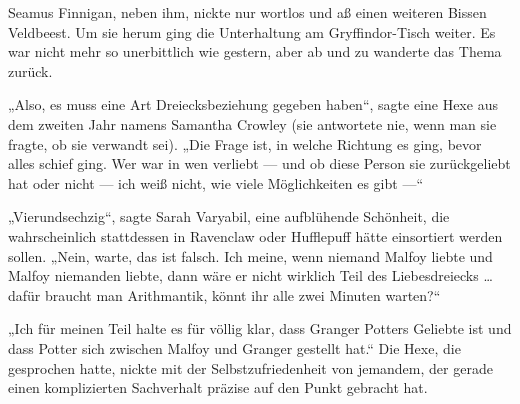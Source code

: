 Seamus Finnigan, neben ihm, nickte nur wortlos und aß einen weiteren Bissen Veldbeest.
Um sie herum ging die Unterhaltung am Gryffindor-Tisch weiter. Es war nicht mehr so unerbittlich wie gestern, aber ab und zu wanderte das Thema zurück.

„Also, es muss eine Art Dreiecksbeziehung gegeben haben“, sagte eine Hexe aus dem zweiten Jahr namens Samantha Crowley (sie antwortete nie, wenn man sie fragte, ob sie verwandt sei).
„Die Frage ist, in welche Richtung es ging, bevor alles schief ging. Wer war in wen verliebt — und ob diese Person sie zurückgeliebt hat oder nicht — ich weiß nicht, wie viele Möglichkeiten es gibt —“

„Vierundsechzig“, sagte Sarah Varyabil, eine aufblühende Schönheit, die wahrscheinlich stattdessen in Ravenclaw oder Hufflepuff hätte einsortiert werden sollen.
„Nein, warte, das ist falsch. Ich meine, wenn niemand Malfoy liebte und Malfoy niemanden liebte, dann wäre er nicht wirklich Teil des Liebesdreiecks … dafür braucht man Arithmantik, könnt ihr alle zwei Minuten warten?“

„Ich für meinen Teil halte es für völlig klar, dass Granger Potters Geliebte ist und dass Potter sich zwischen Malfoy und Granger gestellt hat.“ Die Hexe, die gesprochen hatte, nickte mit der Selbstzufriedenheit von jemandem, der gerade einen komplizierten Sachverhalt präzise auf den Punkt gebracht hat.

